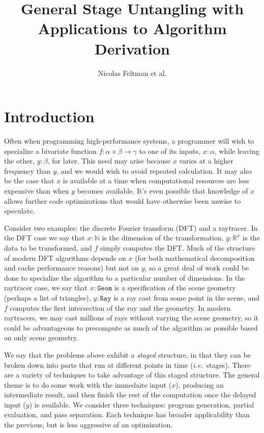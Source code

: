 \documentclass{article}
\title{\Large\textbf{General Stage Untangling with Applications to Algorithm Derivation}}
\author{Nicolas Feltman et al.}
\begin{document}
\maketitle
\section{Introduction}
Often when programming high-performance systems, a programmer will wish to specialize a bivariate function $f : \alpha \times \beta \to \gamma$ to one of its inputs, $x : \alpha$, while leaving the other, $y : \beta$, for later.  This need may arise because $x$ varies at a higher frequency than $y$, and we would wish to avoid repeated calculation. It may also be the case that $x$ is available at a time when computational resources are less expensive than when $y$ becomes available.  It's even possible that knowledge of $x$ allows further code optimizations that would have otherwise been unwise to speculate.  

Consider two examples: the discrete Fourier transform (DFT) and a raytracer.  In the DFT case we say that $x : \mathbb{N}$ is the dimension of the transformation, $y : \mathbb{R}^x $ is the data to be transformed, and $f$ simply computes the DFT.  Much of the structure of modern DFT algorithms depends on $x$ (for both mathematical decomposition and cache performance reasons) but not on $y$, so a great deal of work could be done to specialize the algorithm to a particular number of dimensions.  In the raytracer case, we say that $x : \mathtt{Geom}$ is a specification of the scene geometry (perhaps a list of triangles), $y : \mathtt{Ray}$ is a ray cast from some point in the scene, and $f$ computes the first intersection of the ray and the geometry.  In modern raytracers, we may cast millions of rays without varying the scene geometry, so it could be advantageous to precompute as much of the algorithm as possible based on only scene geometry.

We say that the problems above exhibit a {\em staged} structure, in that they can be broken down into parts that run at different points in time ({\em i.e.}~stages).  There are a variety of techniques to take advantage of this staged structure.  The general theme is to do some work with the immedaite input ($x$), producing an intermediate result, and then finish the rest of the computation once the delayed input ($y$) is available.  We consider three techniques: program generation, partial evaluation, and pass separation.  Each technique has broader applicability than the previous, but is less aggressive of an optimization.
\end{document}

